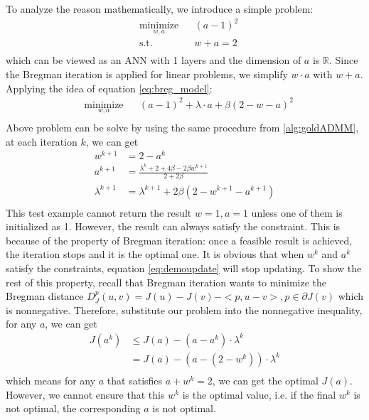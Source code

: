 \documentclass[letterpaper, 10 pt, conference]{ieeeconf}  %
\begin{document}
To analyze the reason mathematically, we introduce a simple problem:
\begin{equation}
\begin{aligned}
& \underset{w,a}{\text{minimize}}  & & (a-1)^2 \\
& \text{s.t.} & & w+a =2\\
\end{aligned}
\label{eq:demo}
\end{equation}
which can be viewed as an ANN with 1 layers and the dimension of $a$ is $\mathbb{R}$. Since the Bregman iteration is applied for linear problems, we simplify $w \cdot a$ with $w + a$. Applying the idea of equation \eqref{eq:breg_model}:
\begin{equation}
\begin{aligned}
& \underset{w,a}{\text{minimize}}  & & (a-1)^2 + \lambda \cdot a + \beta (2-w-a)^2\\
\end{aligned}
\end{equation}
Above problem can be solve by using the same procedure from \ref{alg:goldADMM}, at each iteration $k$, we can get
\begin{equation}
\begin{aligned}
w^{k+1} &= 2-a^k \\
a^{k+1} &= \frac{\lambda^k+2+4\beta-2\beta w^{k+1}}{2+2\beta}\\
\lambda^{k+1} &= \lambda^{k+1} + 2\beta(2-w^{k+1}-a^{k+1})\\
\end{aligned}
\label{eq:demoupdate}
\end{equation}
This test example cannot return the result $w=1,a=1$ unless one of them is initialized as 1. However, the result can always satisfy the constraint. This is because of the property of Bregman iteration: once a feasible result is achieved, the iteration stops and it is the optimal one. It is obvious that when $w^k$ and $a^k$ satisfy the constraints, equation \eqref{eq:demoupdate} will stop updating. To show the rest of this property, recall that Bregman iteration wants to minimize the Bregman distance $D^p_J(u,v) = J(u)-J(v)-<p,u-v>, p \in \partial J(v)$ which is nonnegative. Therefore, substitute our problem into the nonnegative inequality, for any $a$, we can get
\begin{equation}
\begin{aligned}
J(a^k) & \leq J(a) -(a-a^k) \cdot \lambda^k \\
& = J(a) - (a-(2-w^k)) \cdot \lambda^k \\
\end{aligned}
\end{equation}
which means for any $a$ that satisfies $a+w^k=2$, we can get the optimal $J(a)$. However, we cannot ensure that this $w^k$ is the optimal value, i.e. if the final $w^k$ is not optimal, the corresponding $a$ is not optimal.
\end{document}
